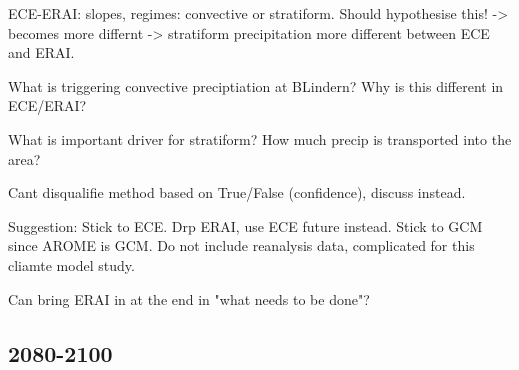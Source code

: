 ECE-ERAI: slopes, regimes: convective or stratiform. Should hypothesise this! -> becomes more differnt -> stratiform precipitation more different between ECE and ERAI. 

What is triggering convective preciptiation at BLindern? Why is this different in ECE/ERAI?

What is important driver for stratiform? How much precip is transported into the area? 

Cant disqualifie method based on True/False (confidence), discuss instead. 

Suggestion: Stick to ECE. Drp ERAI, use ECE future instead. Stick to GCM since AROME is GCM. Do not include reanalysis data, complicated for this cliamte model study.

Can bring ERAI in at the end in "what needs to be done"?

\subsection{2080-2100}
